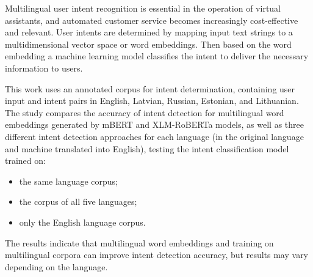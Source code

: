 Multilingual user intent recognition is essential in the operation of virtual assistants, and automated customer service becomes increasingly cost-effective and relevant. User intents are determined by mapping input text strings to a multidimensional vector space or word embeddings. Then based on the word embedding a machine learning model classifies the intent to deliver the necessary information to users.

This work uses an annotated corpus for intent determination, containing user input and intent pairs in English, Latvian, Russian, Estonian, and Lithuanian. The study compares the accuracy of intent detection for multilingual word embeddings generated by mBERT and XLM-RoBERTa models, as well as three different intent detection approaches for each language (in the original language and machine translated into English), testing the intent classification model trained on:

\begin{itemize}
    \item the same language corpus;
    \item the corpus of all five languages;
    \item only the English language corpus.
\end{itemize}

The results indicate that multilingual word embeddings and training on multilingual corpora can improve intent detection accuracy, but results may vary depending on the language.


